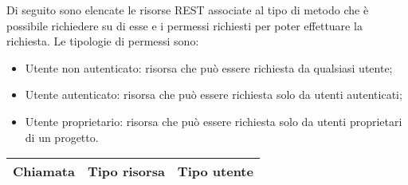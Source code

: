 		Di seguito sono elencate le risorse REST associate al tipo di metodo che è possibile richiedere su di esse e i permessi richiesti per poter effettuare la richiesta.
		Le tipologie di permessi sono:
		\begin{itemize}
			\item Utente non autenticato: risorsa che può essere richiesta da qualsiasi utente;
			\item Utente autenticato: risorsa che può essere richiesta solo da utenti autenticati;
			\item Utente proprietario: risorsa che può essere richiesta solo da utenti proprietari di un progetto.
		\end{itemize}
		
		\begin{table}[h]
			\begin{tabular}{|p{}|p{}|p{}|}
				\toprule
				
				\textbf{Chiamata} & \textbf{Tipo risorsa}  & \textbf{Tipo utente} \\
				\bottomrule
			\end{tabular}\\	
		\end{table}
		
